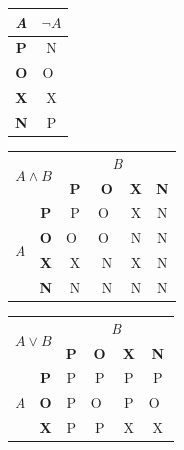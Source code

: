 \documentclass[a4paper, 11pt]{article}
\begin{document}
\begin{table}[ht]
    \begin{center}
        \begin{tabular}{|c|c|}
            \hline
            \emph{A}   & $\neg A$ \\ \hline
            \textbf{P} & N        \\ \hline
            \textbf{O} & O~\\ \hline
            \textbf{X} & X        \\ \hline
            \textbf{N} & P        \\ \hline
        \end{tabular}
        \begin{tabular}{|c|c|c|c|c|c|}
            \hline
            \multicolumn{2}{|c|}{\multirow{2}{*}{$A \wedge B$}} & \multicolumn{4}{c|}{\emph{B}}               \\ \cline{3-6}
            \multicolumn{2}{|c|}{}                        & \textbf{P} & \textbf{O} & \textbf{X} & \textbf{N} \\ \hline
            \multirow{4}{*}{\emph{A}} & \textbf{P}        & P          & O~& X          & N          \\ \cline{2-6}
                                      & \textbf{O}        & O~& O~& N          & N          \\ \cline{2-6}
                                      & \textbf{X}        & X          & N          & X          & N          \\ \cline{2-6}
                                      & \textbf{N}        & N          & N          & N          & N          \\ \hline
        \end{tabular}
        \begin{tabular}{|c|c|c|c|c|c|}
            \hline
            \multicolumn{2}{|c|}{\multirow{2}{*}{$A \vee B$}} & \multicolumn{4}{c|}{\emph{B}}                 \\ \cline{3-6}
            \multicolumn{2}{|c|}{}                        & \textbf{P} & \textbf{O} & \textbf{X} & \textbf{N} \\ \hline
            \multirow{4}{*}{\emph{A}} & \textbf{P}        & P          & P          & P          & P          \\ \cline{2-6}
                                      & \textbf{O}        & P          & O~& P          & O~\\ \cline{2-6}
                                      & \textbf{X}        & P          & P          & X          & X          \\ \cline{2-6}

\end{tabular}
\end{center}
\end{table}
\end{document}
